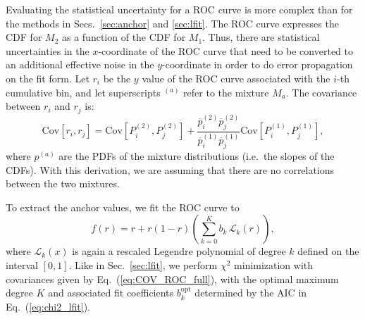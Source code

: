 \documentclass[aps,prd,twocolumn,preprintnumbers,nofootinbib,longbibliography,floatfix]{revtex4-1}
\DeclareRobustCommand{\Sec}[1]{Sec.~\ref{#1}}
\DeclareRobustCommand{\Secs}[2]{Secs.~\ref{#1} and \ref{#2}}
\DeclareRobustCommand{\Eq}[1]{Eq.~(\ref{#1})}
\begin{document}
\begin{figure*}[t]
	$\quad$
	\caption{Comparing the extracted anchor values between the anchor bin method (blue), L-fit method (azure), and R-fit method (cyan).
	Shown are results for the (a) six substructure and (b) four machine-learned observables from \Sec{subsec:observables}, applied to the CMS 2011 Open Data with central value unfolding.
	Our benchmark method using the R-fit method with PFN classification is indicated in red.
	The error bars correspond to statistical uncertainties combined with the AIC uncertainty in quadrature.
	}
	 \label{fig:all_results}
\end{figure*}


Evaluating the statistical uncertainty for a ROC curve is more complex than for the methods in \Secs{sec:anchor}{sec:lfit}.
%
The ROC curve expresses the CDF for $M_2$ as a function of the CDF for $M_1$.
%
Thus, there are statistical uncertainties in the $x$-coordinate of the ROC curve that need to be converted to an additional effective noise in the $y$-coordinate in order to do error propagation on the fit form.
%
Let $r_i$ be the $y$ value of the ROC curve associated with the $i$-th cumulative bin, and let superscripts ${}^{(a)}$ refer to the mixture $M_{a}$.
%
The covariance between $r_i$ and $r_j$ is:
%
\begin{equation}
	\label{eq:COV_ROC_full}
	\text{Cov}[r_i, r_j] = \text{Cov}[P^{(2)}_{i}, P^{(2)}_{j}] +  \frac{\overline{p}^{(2)}_{i}\overline{p}^{(2)}_{j}}
	{\overline{p}^{(1)}_{i}\overline{p}^{(1)}_{j}}
	\text{Cov}[P^{(1)}_{i}, P^{(1)}_{j}],
\end{equation} 
%
where $p^{(a)}$ are the PDFs of the mixture distributions (i.e.~the slopes of the CDFs).
%
With this derivation, we are assuming that there are no correlations between the two mixtures.


To extract the anchor values, we fit the ROC curve to 
%
\begin{equation}
	f(r) = r + r (1-r)\left(\sum_{k=0}^{K}{b_k\, \mathcal{L}_k(r)}\right),
	\label{eq:fit_form}
\end{equation}
%
where $\mathcal{L}_k\left(x\right)$ is again a rescaled Legendre polynomial of degree $k$ defined on the interval $[0, 1]$.
%
Like in \Sec{sec:lfit}, we perform $\chi^2$ minimization with covariances given by \Eq{eq:COV_ROC_full}, with the optimal maximum degree $K$ and associated fit coefficients $b^{\text{opt}}_k$ determined by the AIC in \Eq{eq:chi2_lfit}.
\end{document}
